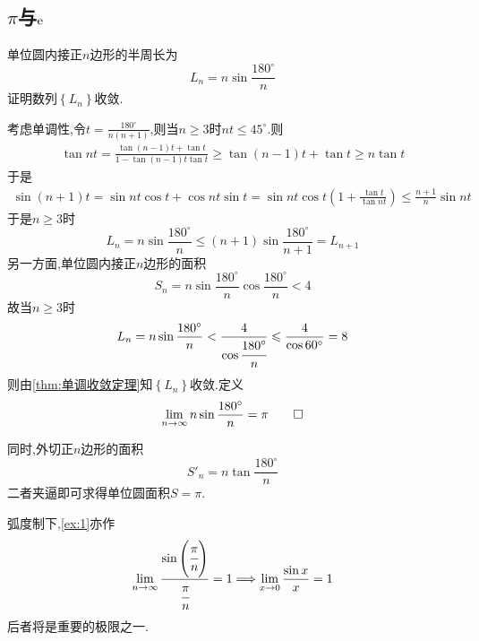\subsection{$\pi$与$\mathrm{e}$}
\begin{brown}
    \begin{example}\label{ex:1}
        单位圆内接正$n$边形的半周长为\[
        L_n=n\sin\frac{180^\circ}{n}
        \]证明数列$\left\{L_n\right\}$收敛.
    \end{example}
    \begin{Proof}
        考虑单调性,令$\displaystyle t=\frac{180^\circ}{n\left(n+1\right)}$,则当$n\geqslant 3$时$nt\leqslant 45^\circ$.则\begin{align*}
            \tan nt=\frac{
                \tan\left(n-1\right)t+\tan t
            }{
                1-\tan\left(n-1\right)t\tan t
            }\geqslant\tan\left(n-1\right)t+\tan t\geqslant n\tan t
        \end{align*}于是\begin{align*}
            \sin\left(n+1\right)t=\sin nt\cos t+\cos nt\sin t=\sin nt\cos t\left(1+\frac{\tan t}{\tan nt}\right)\leqslant\frac{n+1}{n}\sin nt
        \end{align*}于是$n\geqslant 3$时\[
        L_n=n\sin\frac{180^\circ}{n}\leqslant\left(n+1\right)\sin\frac{180^\circ}{n+1}=L_{n+1}
        \]另一方面,单位圆内接正$n$边形的面积\[
        S_n=n\sin\frac{180^\circ}{n}\cos\frac{180^\circ}{n}<4
        \]故当$n\geqslant3$时\[
        L_n=n\sin\frac{180^\circ}{n}<\frac{4}{\cos\cfrac{180^\circ}{n}}\leqslant\frac{4}{\cos60^\circ}=8
        \]则由\cref{thm:单调收敛定理}知$\left\{L_n\right\}$收敛.定义\[
        \lim_{n\to\infty}n\sin\frac{180^\circ}{n}=\pi\qedhere
        \]
    \end{Proof}
    同时,外切正$n$边形的面积\[
    S'_n=n\tan\frac{180^\circ}{n}
    \]二者夹逼即可求得单位圆面积$S=\pi$.
\end{brown}
\begin{red}
    \begin{remark}
        弧度制下,\cref{ex:1}亦作\[
        \lim_{n\to\infty}\frac{\sin\left(\cfrac{\pi}{n}\right)}{\cfrac{\pi}{n}}=1\Longrightarrow\lim_{x\to0}\frac{\sin x}{x}=1
        \]后者将是重要的极限之一.
    \end{remark}
\end{red}
